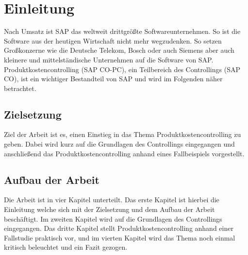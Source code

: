 \section{Einleitung}
Nach Umsatz ist SAP das weltweit drittgrößte Softwareunternehmen. \cite{GroessteUnternehmen} So ist die Software aus der heutigen Wirtschaft nicht mehr wegzudenken.
So setzen Großkonzerne wie die Deutsche Telekom, Bosch oder auch Siemens aber auch kleinere und mittelständische Unternehmen auf die Software von SAP. \cite{SAPCustomers}
Produktkostencontrolling (SAP CO-PC), ein Teilbereich des Controllings (SAP CO), ist ein wichtiger Bestandteil von SAP und wird im Folgenden näher betrachtet.

\subsection{Zielsetzung}
Ziel der Arbeit ist es, einen Einstieg in das Thema Produktkostencontrolling zu geben. Dabei wird kurz auf die Grundlagen des Controllings eingegangen und anschließend das Produktkostencontrolling anhand eines
Fallbeispiels vorgestellt. 

\subsection{Aufbau der Arbeit}
Die Arbeit ist in vier Kapitel unterteilt. Das erste Kapitel ist hierbei die Einleitung welche sich mit der Zielsetzung und dem Aufbau der Arbeit beschäftigt. Im zweiten Kapitel wird auf die Grundlagen des Controllings eingegangen. 
Das dritte Kapitel stellt Produktkostencontrolling anhand einer Fallstudie praktisch vor, und im vierten Kapitel wird das Thema noch einmal kritisch beleuchtet und ein Fazit gezogen.
